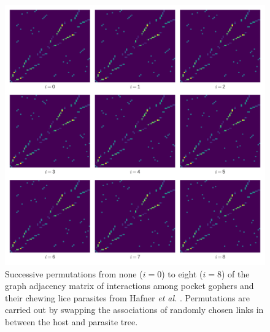 
\begin{figure}
    \centering
    \includegraphics[width=\textwidth]{FishPoo/figures/gopher_louse_adjacency_permutations}
    \caption{Successive permutations from none ($i=0$) to eight ($i=8$) of the graph adjacency matrix of interactions among pocket gophers and their chewing lice parasites from Hafner {\em et al.} \cite{hafner1994disparate}. Permutations are carried out by swapping the associations of randomly chosen links in between the host and parasite tree. }
    \label{fig:FP_ajperm}
\end{figure}